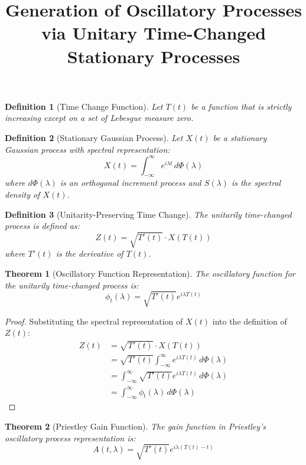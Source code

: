 \documentclass{article}
\title{Generation of Oscillatory Processes via Unitary Time-Changed Stationary Processes}
\author{}
\date{}
\newtheorem{theorem}{Theorem}
\newtheorem{definition}{Definition}
\begin{document}
\maketitle

\begin{definition}[Time Change Function]
Let $T(t)$ be a function that is strictly increasing except on a set of Lebesgue measure zero.
\end{definition}

\begin{definition}[Stationary Gaussian Process]
Let $X(t)$ be a stationary Gaussian process with spectral representation:
\[
X(t) = \int_{-\infty}^{\infty} e^{i\lambda t} \, d\Phi(\lambda)
\]
where $d\Phi(\lambda)$ is an orthogonal increment process and $S(\lambda)$ is the spectral density of $X(t)$.
\end{definition}

\begin{definition}[Unitarity-Preserving Time Change]
The unitarily time-changed process is defined as:
\[
Z(t) = \sqrt{T'(t)} \cdot X(T(t))
\]
where $T'(t)$ is the derivative of $T(t)$.
\end{definition}

\begin{theorem}[Oscillatory Function Representation]
The oscillatory function for the unitarily time-changed process is:
\[
\phi_t(\lambda) = \sqrt{T'(t)} e^{i\lambda T(t)}
\]
\end{theorem}

\begin{proof}
Substituting the spectral representation of $X(t)$ into the definition of $Z(t)$:
\begin{align}
Z(t) &= \sqrt{T'(t)} \cdot X(T(t)) \\
&= \sqrt{T'(t)} \int_{-\infty}^{\infty} e^{i\lambda T(t)} \, d\Phi(\lambda) \\
&= \int_{-\infty}^{\infty} \sqrt{T'(t)} e^{i\lambda T(t)} \, d\Phi(\lambda) \\
&= \int_{-\infty}^{\infty} \phi_t(\lambda) \, d\Phi(\lambda)
\end{align}
\end{proof}

\begin{theorem}[Priestley Gain Function]
The gain function in Priestley's oscillatory process representation is:
\[
A(t,\lambda) = \sqrt{T'(t)} e^{i\lambda(T(t)-t)}
\]
\end{theorem}
\end{document}
